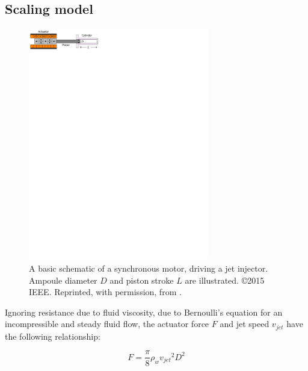     \subsection{Scaling model}                  \label{Chapter:PMLSM design HM/electromagnetic model/scaling}


        \begin{figure}[ht]
          \centering
          \includegraphics[width=0.7\textwidth]{chap3/images/PMLSM_scaling_law_illustration.pdf}
          \caption[A basic schematic of a synchronous motor, driving a jet injector. Ampoule diameter $D$ and piston stroke $L$ are illustrated.]{A basic schematic of a synchronous motor, driving a jet injector. Ampoule diameter $D$ and piston stroke $L$ are illustrated. ©2015 IEEE. Reprinted, with permission, from \cite{Ruddy2015}.}
          \label{fig:chapter/hm/PMLSM scaling law illustrated}
        \end{figure}


        Ignoring resistance due to fluid viscosity, due to Bernoulli's equation for an incompressible and steady fluid flow, the actuator force $F$ and jet speed $v_{jet}$ have the following relationship:
        
        
        \begin{equation}
            F=\frac{\pi}{8}\rho_w {v_{jet}}^2 D^2
            \label{eq:actuation force by PMLSMs}
        \end{equation}
        
